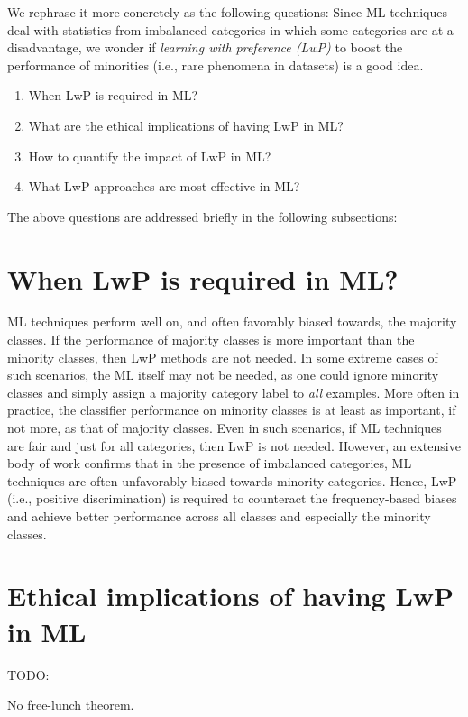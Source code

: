 We rephrase it more concretely as the following questions: 
Since ML techniques deal with statistics from imbalanced categories in which some categories are at a disadvantage, we wonder if \textit{learning with preference (LwP)} to boost the performance of minorities (i.e., rare phenomena in datasets) is a good idea.
\begin{enumerate}
    \item When LwP is required in ML?
    \item What are the ethical implications of having LwP in ML?
    \item How to quantify the impact of LwP in ML?
    \item What LwP approaches are most effective in ML?
\end{enumerate}

The above questions are addressed briefly in the following subsections:

\section{When LwP is required in ML?}
ML techniques perform well on, and often favorably biased towards, the majority classes. 
If the performance of majority classes is more important than the minority classes, then LwP methods are not needed.
In some extreme cases of such scenarios, the ML itself may not be needed, as one could  ignore minority classes and simply assign a majority category label to \textit{all} examples.
More often in practice, the classifier performance on minority classes is at least as important, if not more, as that of majority classes.
Even in such scenarios, if ML techniques are fair and just for all categories, then LwP is not needed. 
However, an extensive body of work confirms that in the presence of imbalanced categories, ML techniques are often unfavorably biased towards minority categories.
Hence, LwP (i.e., positive discrimination) is required to counteract the frequency-based biases and achieve better performance across all classes and especially the minority classes. 

\section{Ethical implications of having LwP in ML}
TODO:

No free-lunch theorem.

